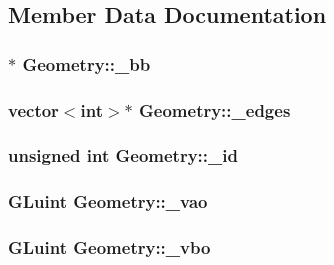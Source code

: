 \subsection{Member Data Documentation}
\hypertarget{class_geometry_a6b3ca6d44997ee99d548a19bc39e0c72}{
\subsubsection[{\+\_\+bb}]{$\ast$ Geometry\+::\+\_\+bb}}\label{class_geometry_a6b3ca6d44997ee99d548a19bc39e0c72}
\hypertarget{class_geometry_af7d427b2dd365204c7d8cd8d94b20a80}{
\subsubsection[{\+\_\+edges}]{\setlength{\rightskip}{0pt plus 5cm}vector$<$int$>$$\ast$ Geometry\+::\+\_\+edges}}\label{class_geometry_af7d427b2dd365204c7d8cd8d94b20a80}
\hypertarget{class_geometry_afdd3cb26908cc8cd257caeb1af9376ef}{
\subsubsection[{\+\_\+id}]{\setlength{\rightskip}{0pt plus 5cm}unsigned int Geometry\+::\+\_\+id}}\label{class_geometry_afdd3cb26908cc8cd257caeb1af9376ef}
\hypertarget{class_geometry_ae8c3a8b756c681aa95bf7e0998f0a37d}{
\subsubsection[{\+\_\+vao}]{\setlength{\rightskip}{0pt plus 5cm}G\+Luint Geometry\+::\+\_\+vao}}\label{class_geometry_ae8c3a8b756c681aa95bf7e0998f0a37d}
\hypertarget{class_geometry_a66c15fff8a8a614e5f9734974354fd2e}{
\subsubsection[{\+\_\+vbo}]{\setlength{\rightskip}{0pt plus 5cm}G\+Luint Geometry\+::\+\_\+vbo}}\label{class_geometry_a66c15fff8a8a614e5f9734974354fd2e}
